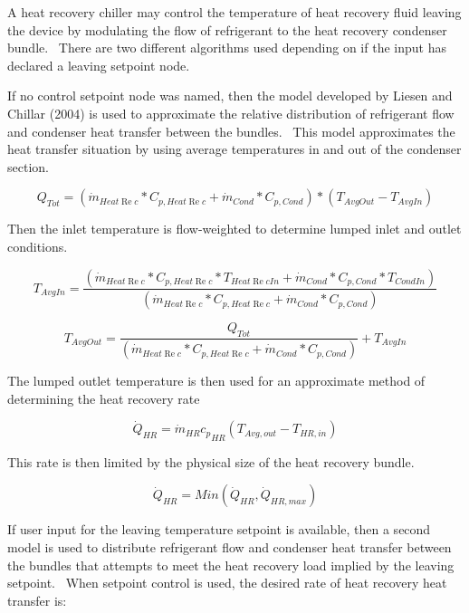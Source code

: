 A heat recovery chiller may control the temperature of heat recovery fluid leaving the device by modulating the flow of refrigerant to the heat recovery condenser bundle.~ There are two different algorithms used depending on if the input has declared a leaving setpoint node.

If no control setpoint node was named, then the model developed by Liesen and Chillar (2004) is used to approximate the relative distribution of refrigerant flow and condenser heat transfer between the bundles.~ This model approximates the heat transfer situation by using average temperatures in and out of the condenser section.

\begin{equation}
{Q_{Tot}} = ({\dot m_{Heat\operatorname{Re} c}}*{C_{p,Heat\operatorname{Re} c}} + {\dot m_{Cond}}*{C_{p,Cond}})*({T_{AvgOut}} - {T_{AvgIn}})
\end{equation}

Then the inlet temperature is flow-weighted to determine lumped inlet and outlet conditions.

\begin{equation}
{T_{AvgIn}} = \frac{{({{\dot m}_{Heat\operatorname{Re} c}}*{C_{p,Heat\operatorname{Re} c}}*{T_{Heat\operatorname{Re} cIn}} + {{\dot m}_{Cond}}*{C_{p,Cond}}*{T_{CondIn}})}}{{({{\dot m}_{Heat\operatorname{Re} c}}*{C_{p,Heat\operatorname{Re} c}} + {{\dot m}_{Cond}}*{C_{p,Cond}})}}
\end{equation}

\begin{equation}
{T_{AvgOut}} = \frac{{{Q_{Tot}}}}{{({{\dot m}_{Heat\operatorname{Re} c}}*{C_{p,Heat\operatorname{Re} c}} + {{\dot m}_{Cond}}*{C_{p,Cond}})}} + {T_{AvgIn}}
\end{equation}

The lumped outlet temperature is then used for an approximate method of determining the heat recovery rate

\begin{equation}
{\dot Q_{HR}} = {\dot m_{HR}}{c_p}_{HR}\left( {{T_{Avg,out}} - {T_{HR,in}}} \right)
\end{equation}

This rate is then limited by the physical size of the heat recovery bundle.

\begin{equation}
{\dot Q_{HR}} = Min\left( {{{\dot Q}_{HR}},{{\dot Q}_{HR,max}}} \right)
\end{equation}

If user input for the leaving temperature setpoint is available, then a second model is used to distribute refrigerant flow and condenser heat transfer between the bundles that attempts to meet the heat recovery load implied by the leaving setpoint.~ When setpoint control is used, the desired rate of heat recovery heat transfer is:

